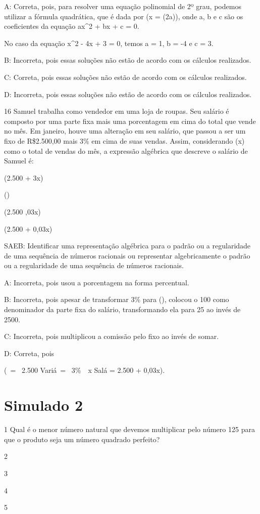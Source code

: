 {A: Correta, pois, para resolver uma equação polinomial de 2º grau,
podemos utilizar a fórmula quadrática, que é dada por
(x =  {(2a)}), onde a, b e c são os
coeficientes da equação ax^2 + bx + c = 0.

No caso da equação x^2 - 4x + 3 = 0, temos a = 1, b = -4 e c = 3.

B: Incorreta, pois essas soluções não estão de acordo com os cálculos
realizados.

C: Correta, pois essas soluções não estão de acordo com os cálculos
realizados.

D: Incorreta, pois essas soluções não estão de acordo com os cálculos
realizados.

\num{16} Samuel trabalha como vendedor em uma loja de roupas. Seu salário é
composto por uma parte fixa mais uma porcentagem em cima do total que
vende no mês. Em janeiro, houve uma alteração em seu salário, que passou
a ser um fixo de R\$2.500,00 mais 3\% em cima de suas vendas. Assim,
considerando (x) como o total de vendas do mês, a expressão algébrica
que descreve o salário de Samuel é:
\item (2.500 + 3x)
\item ()
\item (2.500 ,03x)
\item (2.500 + 0,03x)

SAEB: Identificar uma representação algébrica para o padrão ou a
regularidade de uma sequência de números racionais ou representar
algebricamente o padrão ou a regularidade de uma sequência de números
racionais.

A: Incorreta, pois usou a porcentagem na forma percentual.

B: Incorreta, pois apesar de transformar 3\% para (),
colocou o 100 como denominador da parte fixa do salário, transformando
ela para 25 ao invés de 2500.

C: Incorreta, pois multiplicou a comissão pelo fixo ao invés de somar.

D: Correta, pois

(\ = \ 2.500 \; {Vari}á\  = \ 3\%\ \ x \; {Sal}á = 2.500 + 0,03x).


\section*{Simulado 2}

\num{1} Qual é o menor número natural que devemos multiplicar pelo número 125
para que o produto seja um número quadrado perfeito?
\item 2
\item 3
\item 4
\item 5

}
